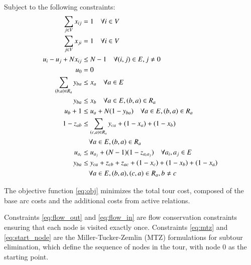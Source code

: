 \documentclass[twocolumn, switch]{article} %
\begin{document}
Subject to the following constraints:
\begin{subequations}
\begin{align}
    \sum_{j \in V} x_{ij} &= 1 \quad \forall i \in V \label{eq:flow_out} \\
    \sum_{j \in V} x_{ji} &= 1 \quad \forall i \in V \label{eq:flow_in} \\
    u_i - u_j + N x_{ij} &\leq N-1 \quad \forall (i,j) \in E, j \neq 0 \label{eq:mtz} \\
    u_0 &= 0 \label{eq:start_node} \\
    \sum_{(b,a) \in R_a} y_{ba} &\leq x_a \quad \forall a \in E \label{eq:rel_active_1} \\
    y_{ba} &\leq x_b \quad \forall a \in E, (b,a) \in R_a \label{eq:rel_active_2} \\
    u_b + 1 &\leq u_a + N(1-y_{ba}) \quad \forall a \in E, (b,a) \in R_a \label{eq:rel_precedence} \\
    1 - z_{ab} &\leq \sum_{(c,a) \in R_a} y_{ca} + (1 - x_a) + (1 - x_b) \notag \\
    &\quad \forall a \in E, (b,a) \in R_a \label{eq:rel_active_3} \\
    u_{a_i} &\leq u_{a_j} + (N-1)(1-z_{a_ia_j}) \quad \forall a_i, a_j \in E \label{eq:z_precedence} \\
    y_{ba} &\leq y_{ca} + z_{cb} + z_{ac} + (1-x_c) + (1-x_b) + (1-x_a) \notag \\
    &\quad \forall a \in E, (b,a),(c,a) \in R_a, b \neq c \label{eq:rel_last_trigger}
\end{align}
\end{subequations}

\normalsize

The objective function \eqref{eq:obj} minimizes the total tour cost, composed of the base arc costs and the additional costs from active relations.

Constraints \eqref{eq:flow_out} and \eqref{eq:flow_in} are flow conservation constraints ensuring that each node is visited exactly once.
Constraints \eqref{eq:mtz} and \eqref{eq:start_node} are the Miller-Tucker-Zemlin (MTZ) formulations for subtour elimination, which define the sequence of nodes in the tour, with node 0 as the starting point.
\end{document}
